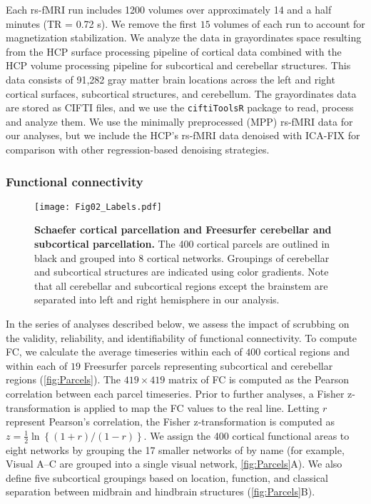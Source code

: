 \documentclass{article}
\newcommand{\R}{\texttt{R}\xspace}
\newcommand{\ciftiTools}{\texttt{ciftiTools}\xspace}
\begin{document}
Each rs-fMRI run includes 1200 volumes over approximately 14 and a half minutes (TR = 0.72 s). We remove the first $15$ volumes of each run to account for magnetization stabilization. We analyze the data in grayordinates space resulting from the HCP surface processing pipeline of cortical data combined with the HCP volume processing pipeline for subcortical and cerebellar structures. This data consists of 91,282 gray matter brain locations across the left and right cortical surfaces, subcortical structures, and cerebellum. The grayordinates data are stored as CIFTI files, and we use the \ciftiTools \R package \citep{pham2022ciftitools} to read, process and analyze them. We use the minimally preprocessed (MPP) rs-fMRI data \citep{glasserMinimalPreprocessingPipelines2013} for our analyses, but we include the HCP's rs-fMRI data denoised with ICA-FIX \citep{griffantiICAbasedArtefactRemoval2014} for comparison with other regression-based denoising strategies.  


\subsubsection{Functional connectivity}

\begin{figure}
    \centering
    \texttt{[image: Fig02\_Labels.pdf]}
    \caption{\small \textbf{Schaefer cortical parcellation and Freesurfer cerebellar and subcortical parcellation.} The 400 cortical parcels are outlined in black and grouped into 8 cortical networks.  Groupings of cerebellar and subcortical structures are indicated using color gradients. Note that all cerebellar and subcortical regions except the brainstem are separated into left and right hemisphere in our analysis.}
    \label{fig:Parcels}
\end{figure}

In the series of analyses described below, we assess the impact of scrubbing on the validity, reliability, and identifiability of functional connectivity. To compute FC, we calculate the average timeseries within each of $400$ cortical regions \citep{schaeferLocalGlobalParcellationHuman2018, kong2021individual} and within each of $19$ Freesurfer parcels representing subcortical and cerebellar regions (\autoref{fig:Parcels}).  The $419\times419$ matrix of FC is computed as the Pearson correlation between each parcel timeseries. Prior to further analyses, a Fisher z-transformation is applied to map the FC values to the real line.  Letting $r$ represent Pearson's correlation, the Fisher z-transformation is computed as $z = \frac{1}{2}\ln\left\{{(1+r)}/{(1-r)}\right\}$. We assign the 400 cortical functional areas to eight networks by grouping the 17 smaller networks of \cite{kong2021individual} by name (for example, Visual A--C are grouped into a single visual network, \autoref{fig:Parcels}A). We also define five subcortical groupings based on location, function, and classical separation between midbrain and hindbrain structures (\autoref{fig:Parcels}B). 
\end{document}
